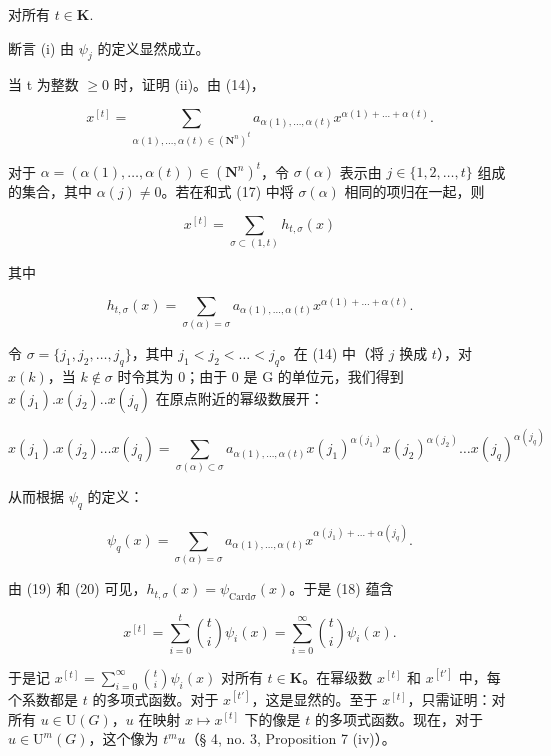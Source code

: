 对所有 \(t\in \mathbf{K}.\)

断言 (i) 由 \(\psi_{j}\) 的定义显然成立。

当 t 为整数 \(\geqslant0\) 时，证明 (ii)。由 (14)，

\[
x ^ {[ t ]} = \sum_ {\alpha (1),\ldots,\alpha (t)\in(\mathbf{N}^{n})^{t}} a _ {\alpha (1), \dots , \alpha (t)} x ^ {\alpha (1) + \dots + \alpha (t)}.\tag{17}
\]

对于 \(\alpha = (\alpha(1),\ldots,\alpha(t))\in(\mathbf{N}^{n})^{t}\)，令 \(\sigma(\alpha)\) 表示由 \(j\in\{1,2,\ldots,t\}\) 组成的集合，其中 \(\alpha(j)\neq0\)。若在和式 (17) 中将 \(\sigma(\alpha)\) 相同的项归在一起，则

\[
x ^ {[ t ]} = \sum_ {\sigma \subset (1, t)} h _ {t, \sigma} (x)\tag{18}
\]

其中

\[
h _ {t, \sigma} (x) = \sum_ {\sigma (\alpha) = \sigma} a _ {\alpha (1), \dots , \alpha (t)} x ^ {\alpha (1) + \dots + \alpha (t)}.\tag{19}
\]

令 \(\sigma = \{j_1, j_2, \ldots, j_q\}\)，其中 \(j_1 < j_2 < \ldots < j_q\)。在 (14) 中（将 \(j\) 换成 \(t\)），对 \(x(k)\)，当 \(k \notin \sigma\) 时令其为 0；由于 0 是 G 的单位元，我们得到 \(x(j_1).x(j_2)..x(j_q)\) 在原点附近的幂级数展开：

\[
x (j _ {1}). x (j _ {2}) \dots x (j _ {q}) = \sum_ {\sigma (\alpha) \subset \sigma} a _ {\alpha (1), \dots , \alpha (t)} x (j _ {1}) ^ {\alpha (j _ {1})} x (j _ {2}) ^ {\alpha (j _ {2})} \dots x (j _ {q}) ^ {\alpha (j _ {q})}
\]

从而根据 \(\psi_q\) 的定义：

\[
\psi_ {q} (x) = \sum_ {\sigma (\alpha) = \sigma} a _ {\alpha (1), \dots , \alpha (t)} x ^ {\alpha (j _ {1}) + \dots + \alpha (j _ {q})}.\tag{20}
\]

由 (19) 和 (20) 可见，\(h_{t,\sigma}(x) = \psi_{\mathrm{Card}\sigma}(x)\)。于是 (18) 蕴含

\[
x ^ {[ t ]} = \sum_ {i = 0} ^ {t} \binom {t} {i} \psi_ {i} (x) = \sum_ {i = 0} ^ {\infty} \binom {t} {i} \psi_ {i} (x).
\]

于是记 \(x^{[t]} = \sum_{i=0}^{\infty} \binom{t}{i}\psi_i(x)\) 对所有 \(t\in\mathbf{K}\)。在幂级数 \(x^{[t]}\) 和 \(x^{[t']}\) 中，每个系数都是 \(t\) 的多项式函数。对于 \(x^{[t']}\)，这是显然的。至于 \(x^{[t]}\)，只需证明：对所有 \(u\in\mathrm{U}(G)\)，\(u\) 在映射 \(x\mapsto x^{[t]}\) 下的像是 \(t\) 的多项式函数。现在，对于 \(u\in\mathrm{U}^{m}(G)\)，这个像为 \(t^{m}u\)（§ 4, no. 3, Proposition 7 (iv)）。

